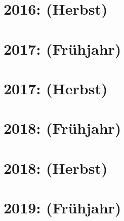 \documentclass{lehramt-informatik-haupt}
\begin{document}
\section{2016: (Herbst)}


\section{2017: (Frühjahr)}


\section{2017: (Herbst)}


\section{2018: (Frühjahr)}


\section{2018: (Herbst)}


\section{2019: (Frühjahr)}

\end{document}
